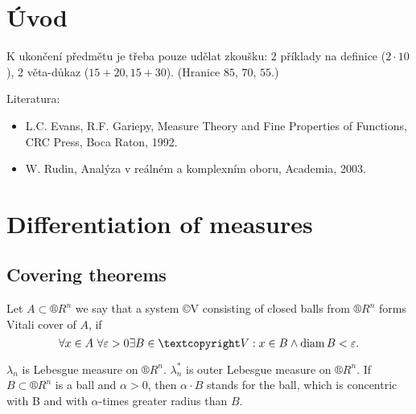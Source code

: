 \documentclass[12pt]{article}					%
\begin{document}
\section*{Úvod}
\begin{poznamka}
	K ukončení předmětu je třeba pouze udělat zkoušku: 2 příklady na definice ($2·10$), 2 věta-důkaz ($15+20, 15+30$). (Hranice $85$, $70$, $55$.)

	Literatura:
	\begin{itemize}
		\item L.C. Evans, R.F. Gariepy, Measure Theory and Fine Properties of Functions, CRC Press, Boca Raton, 1992.
		\item W. Rudin, Analýza v reálném a komplexním oboru, Academia, 2003.
	\end{itemize}
\end{poznamka}

\section{Differentiation of measures}
\subsection{Covering theorems}

\begin{definice}
	Let $A \subset ®R^n$ we say that a system ©V consisting of closed balls from $®R^n$ forms Vitali cover of $A$, if
	$$ \forall x \in A\ \forall \epsilon > 0 \exists B \in ©V: x \in B \land \diam B < \epsilon. $$
\end{definice}

\begin{definice}[Notation]
	$\lambda_n$ is Lebesgue measure on $®R^n$. $\lambda_n^*$ is outer Lebesgue measure on $®R^n$. If $B \subset ®R^n$ is a ball and $\alpha > 0$, then $\alpha · B$ stands for the ball, which is concentric with B and with $\alpha$-times greater radius than $B$.
\end{definice}
\end{document}
